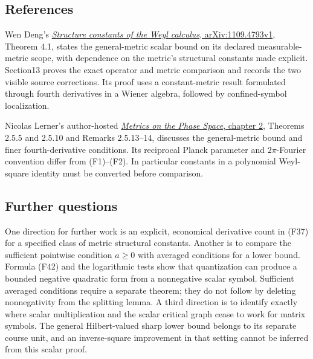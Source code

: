 \documentclass[
  11pt,
]{article}
\makeatletter
\let\ReaderOriginalAnchorStart\hyper@anchorstart
\let\ReaderOriginalAnchorEnd\hyper@anchorend
\let\ReaderPendingAliases\@empty
\def\ReaderArmAliases#1{\gdef\ReaderPendingAliases{#1}}
\def\hyper@anchorstart#1{\ReaderIfNativeAnchorTF{#1}{\ReaderPendingAliases\global\let\ReaderPendingAliases\@empty}{}\ReaderOriginalAnchorStart{#1}}
\makeatother
\begin{document}
\ReaderArmAliases{\ReaderOriginalAnchorStart{reading-provenance-and-research-directions}\ReaderOriginalAnchorEnd\begingroup\expandafter\def\csname @currentHref\endcsname{reading-provenance-and-research-directions}\label{reading-provenance-and-research-directions}\endgroup\ReaderOriginalAnchorStart{references}\ReaderOriginalAnchorEnd}
\subsection{References}\label{references}

Wen Deng's \href{https://arxiv.org/abs/1109.4793v1}{\emph{Structure
constants of the Weyl calculus}, arXiv:1109.4793v1}, Theorem 4.1, states
the general-metric scalar bound on its declared measurable-metric scope,
with dependence on the metric's structural constants made explicit.
Section13 proves the exact operator and metric comparison and records
the two visible source corrections. Its proof uses a constant-metric
result formulated through fourth derivatives in a Wiener algebra,
followed by confined-symbol localization.

Nicolas Lerner's author-hosted
\href{https://webusers.imj-prg.fr/~nicolas.lerner/ch2booklerner.pdf}{\emph{Metrics
on the Phase Space}, chapter 2}, Theorems 2.5.5 and 2.5.10 and Remarks
2.5.13--14, discusses the general-metric bound and finer
fourth-derivative conditions. Its reciprocal Planck parameter and
\(2\pi\)-Fourier convention differ from (F1)--(F2). In particular
constants in a polynomial Weyl-square identity must be converted before
comparison.

\subsection{Further questions}\label{further-questions}

One direction for further work is an explicit, economical derivative
count in (F37) for a specified class of metric structural constants.
Another is to compare the sufficient pointwise condition \(a\geq0\) with
averaged conditions for a lower bound. Formula (F42) and the logarithmic
tests show that quantization can produce a bounded negative quadratic
form from a nonnegative scalar symbol. Sufficient averaged conditions
require a separate theorem; they do not follow by deleting nonnegativity
from the splitting lemma. A third direction is to identify exactly where
scalar multiplication and the scalar critical graph cease to work for
matrix symbols. The general Hilbert-valued sharp lower bound belongs to
its separate course unit, and an inverse-square improvement in that
setting cannot be inferred from this scalar proof.
\end{document}
